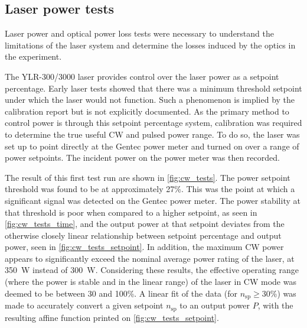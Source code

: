         \subsection{Laser power tests}
            Laser power and optical power loss tests were necessary to understand the limitations of the laser system and determine the losses induced by the optics in the experiment.

            The YLR-300/3000 laser provides control over the laser power as a setpoint percentage. Early laser tests showed that there was a minimum threshold setpoint under which the laser would not function. Such a phenomenon is implied by the calibration report but is not explicitly documented. As the primary method to control power is through this setpoint percentage system, calibration was required to determine the true useful CW and pulsed power range. To do so, the laser was set up to point directly at the Gentec power meter and turned on over a range of power setpoints. The incident power on the power meter was then recorded.

            The result of this first test run are shown in \autoref{fig:cw_tests}. The power setpoint threshold was found to be at approximately 27\%. This was the point at which a significant signal was detected on the Gentec power meter. The power stability at that threshold is poor when compared to a higher setpoint, as seen in \autoref{fig:cw_tests_time}, and the output power at that setpoint deviates from the otherwise closely linear relationship between setpoint percentage and output power, seen in \autoref{fig:cw_tests_setpoint}. In addition, the maximum CW power appears to significantly exceed the nominal average power rating of the laser, at \qty{350}{W} instead of \qty{300}{W}. Considering these results, the effective operating range (where the power is stable and in the linear range) of the laser in CW mode was deemed to be between 30 and 100\%. A linear fit of the data (for $n_\mathrm{sp} \geq 30$\%) was made to accurately convert a given setpoint $n_\mathrm{sp}$ to an output power $P$, with the resulting affine function printed on \autoref{fig:cw_tests_setpoint}.

